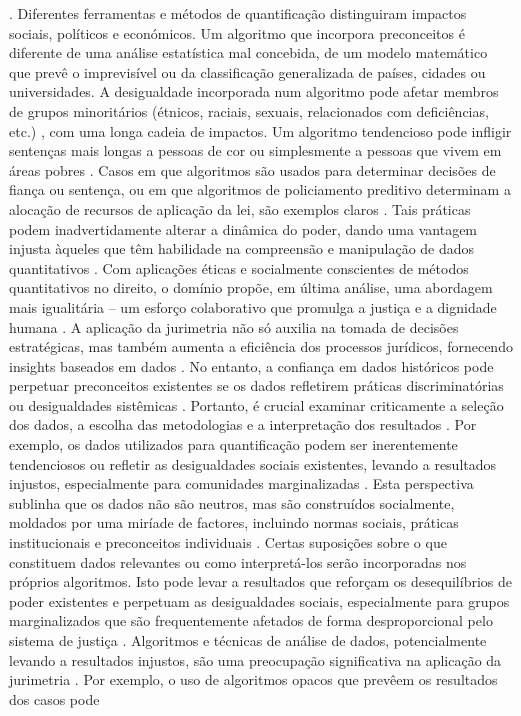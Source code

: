 \begin{agradecimentos}
\cite{10.1590/dados.2022.65.3.267,10.3390/fi9040068}. Diferentes ferramentas e métodos de quantificação distinguiram impactos sociais, políticos e económicos. Um algoritmo que incorpora preconceitos é diferente de uma análise estatística mal concebida, de um modelo matemático que prevê o imprevisível ou da classificação generalizada de países, cidades ou universidades. A desigualdade incorporada num algoritmo pode afetar membros de grupos minoritários (étnicos, raciais, sexuais, relacionados com deficiências, etc.) \cite{danaher2017}, com uma longa cadeia de impactos. Um algoritmo tendencioso pode infligir sentenças mais longas a pessoas de cor ou simplesmente a pessoas que vivem em áreas pobres \cite{10.1590/dados.2022.65.3.267,1023071190721}. Casos em que algoritmos são usados para determinar decisões de fiança ou sentença, ou em que algoritmos de policiamento preditivo determinam a alocação de recursos de aplicação da lei, são exemplos claros \cite{10.1590/dados.2022.65.3.267,1023071190721}. Tais práticas podem inadvertidamente alterar a dinâmica do poder, dando uma vantagem injusta àqueles que têm habilidade na compreensão e manipulação de dados quantitativos \cite{10.1590/dados.2022.65.3.267,1023071190721}. Com aplicações éticas e socialmente conscientes de métodos quantitativos no direito, o domínio propõe, em última análise, uma abordagem mais igualitária – um esforço colaborativo que promulga a justiça e a dignidade humana \cite{10.1007/s11186-021}. A aplicação da jurimetria não só auxilia na tomada de decisões estratégicas, mas também aumenta a eficiência dos processos jurídicos, fornecendo insights baseados em dados \cite{silva2023role,103390fi9040068}. No entanto, a confiança em dados históricos pode perpetuar preconceitos existentes se os dados refletirem práticas discriminatórias ou desigualdades sistêmicas \cite{10.1590/dados.2022.65.3.267,10.1057/s41599-020-0396-5}. Portanto, é crucial examinar criticamente a seleção dos dados, a escolha das metodologias e a interpretação dos resultados \cite{10.1590/dados.2022.65.3.267,10.32586/rcda.v18i1.585}. Por exemplo, os dados utilizados para quantificação podem ser inerentemente tendenciosos ou refletir as desigualdades sociais existentes, levando a resultados injustos, especialmente para comunidades marginalizadas \cite{10.1590/dados.2022.65.3.267,10.1057/s41599-020-00557-0}. Esta perspectiva sublinha que os dados não são neutros, mas são construídos socialmente, moldados por uma miríade de factores, incluindo normas sociais, práticas institucionais e preconceitos individuais \cite{10.1057/s41599-020-00557-0,salais2016quantification}. Certas suposições sobre o que constituem dados relevantes ou como interpretá-los serão incorporadas nos próprios algoritmos. Isto pode levar a resultados que reforçam os desequilíbrios de poder existentes e perpetuam as desigualdades sociais, especialmente para grupos marginalizados que são frequentemente afetados de forma desproporcional pelo sistema de justiça \cite{taylor2018}. Algoritmos e técnicas de análise de dados, potencialmente levando a resultados injustos, são uma preocupação significativa na aplicação da jurimetria \cite{10.1590/dados.2022.65.3.267,10.3390/fi9040068}. Por exemplo, o uso de algoritmos opacos que prevêem os resultados dos casos pode 
\end{agradecimentos}
